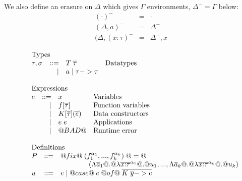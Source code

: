 \documentclass[preprint,nocopyrightspace]{sigplanconf}
\begin{document}
We also define an erasure on $\Delta$ which gives $\Gamma$ environments, $\Delta^{-} = \Gamma$ below:
\[\begin{array}{lrll}
(\cdot)^{-}            & = & \cdot \\
(\Delta,a)^{-}         & = & \Delta^{-} \\
(\Delta,(x{:}\tau)^{-} & = & \Delta^{-},x 
\end{array}\]

\newcommand{\ar}{\alpha}

\begin{figure}\small
\[\begin{array}{l} 
\begin{array}{lrll}
\multicolumn{3}{l}{\text{Types}} \\
\tau,\sigma & ::=  & T\;\taus & \text{Datatypes} \\ 
            & \mid & a \mid \tau -> \tau 
\end{array}\\ \\ 
\begin{array}{lrll}
\multicolumn{3}{l}{\text{Expressions}} \\
e  & ::=  & x            & \text{Variables} \\ 
   & \mid & f[\ol{\tau}] & \text{Function variables} \\ 
   & \mid & K[\ol{\tau}](\ol{e}) & \text{Data constructors} \\
   & \mid & e\;e         & \text{Applications} \\
   & \mid & @BAD@        & \text{Runtime error} \\ 
\end{array}\\ \\ 
\begin{array}{lrll}
\multicolumn{3}{l}{\text{Definitions}} \\
P   & ::= & @fix@\;(f_1^{\ar_1},...,f_k^{\ar_k})\;@=@ \\ 
    &     & \quad\quad\quad\quad (\Lambda\as_1 @.@ \lambda{\oln{x{:}\tau}{\ar_1}} @.@ u_1,...,
                                                \Lambda\as_k @.@ \lambda{\oln{x{:}\tau}{\ar_k}} @.@ u_k) \\
u   & ::= & e \mid @case@\;e\;@of@\;\ol{K\;\ol{y} -> e} \\ 
\end{array}\\ \\ 

\end{array}\]
\end{figure}
\end{document}
